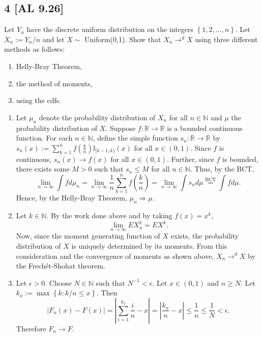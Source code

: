 \documentclass[12pt]{article}
\begin{document}
\subsection*{4 [AL 9.26]}
\begin{tcolorbox}
Let $Y_n$ have the discrete uniform distribution on the integers $\left\{ 1,2,\hdots, n \right\}$. Let $X_n := Y_n / n$ and let $X \sim$ Uniform(0,1).
Show that $X_n \rightarrow^{d} X$ using three different methods as follows:
\begin{enumerate}[label=(\alph*)]
\item Helly-Bray Theorem,
\item the method of moments,
\item using the cdfs.
\end{enumerate}
\end{tcolorbox}
\begin{enumerate}[label=(\alph*)]
\item Let $\mu_n$ denote the probability distribution of $X_n$ for all $n \in \mathbb{N}$ and $\mu$ the probability distribution of $X$.
Suppose $f : \mathbb{R} \rightarrow \mathbb{R}$ is a bounded continuous function. For each $n \in \mathbb{N}$, define the simple function $s_n :
\mathbb{R} \rightarrow \mathbb{R}$ by $s_n(x) := \sum_{k=1}^{n}f\left( \frac{k}{n} \right)\mathbb{I}_{[k-1,k)}(x)$ for all $x \in (0,1)$. Since $f$ is continuous,
$s_n(x) \rightarrow f(x)$ for all $x \in (0,1)$. Further, since $f$ is bounded, there exists some $M > 0$ such that $s_n \leq M$ for all $n \in
\mathbb{N}$. Thus, by the BCT,
\[ \lim_{n\rightarrow\infty}\int f d\mu_n = \lim_{n\rightarrow\infty}\frac{1}{n}\sum_{k=1}^{n}f\left( \frac{k}{n} \right) =
\lim_{n\rightarrow\infty}\int s_n d\mu \stackrel{\text{BCT}}{=} \int fd\mu. \]
Hence, by the Helly-Bray Theorem, $\mu_n \Rightarrow \mu$.
\item Let $k \in \mathbb{N}$. By the work done above and by taking $f(x) = x^{k}$,
\[ \lim_{n\rightarrow\infty}EX_n^{k} = EX^{k}. \]
Now, since the moment generating function of $X$ exists, the probability distribution of $X$ is uniquely determined by its moments. From this
consideration and the convergence of moments as shown above, $X_n \rightarrow^{d} X$ by the Frech\'{e}t-Shohat theorem.
\item Let $\epsilon > 0$. Choose $N \in \mathbb{N}$ such that $N^{-1} < \epsilon$. Let $x \in (0,1)$ and $n \geq N$. Let $k_x := \max\left\{ k :
k/n \leq x\right\}$. Then
\[ |F_n(x) - F(x)| = \left| \sum_{i=1}^{k_x}\frac{i}{n} - x\right| = \left| \frac{k_x}{n} - x\right| \leq \frac{1}{n} \leq \frac{1}{N} < \epsilon. \]
Therefore $F_n \rightarrow F$.
\end{enumerate}
\end{document}
